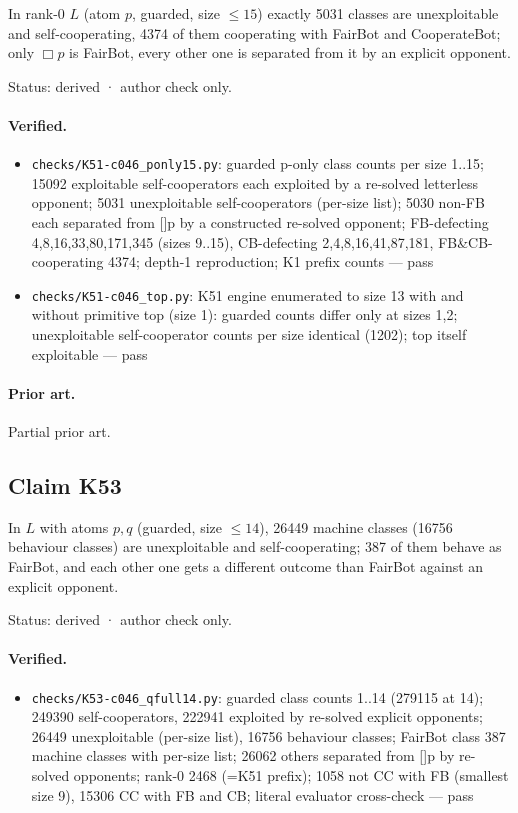 \documentclass{article}
\begin{document}
In rank-0 $L$ (atom $p$, guarded, size $\le15$) exactly 5031 classes are unexploitable and self-cooperating, 4374 of them cooperating with FairBot and CooperateBot; only $\Box p$ is FairBot, every other one is separated from it by an explicit opponent.

Status: derived · author check only.

\paragraph{Verified.}
\begin{itemize}
\item \texttt{checks/K51-c046\_ponly15.py}: guarded p-only class counts per size 1..15; 15092 exploitable self-cooperators each exploited by a re-solved letterless opponent; 5031 unexploitable self-cooperators (per-size list); 5030 non-FB each separated from []p by a constructed re-solved opponent; FB-defecting 4,8,16,33,80,171,345 (sizes 9..15), CB-defecting 2,4,8,16,41,87,181, FB\&CB-cooperating 4374; depth-1 reproduction; K1 prefix counts --- pass
\item \texttt{checks/K51-c046\_top.py}: K51 engine enumerated to size 13 with and without primitive top (size 1): guarded counts differ only at sizes 1,2; unexploitable self-cooperator counts per size identical (1202); top itself exploitable --- pass
\end{itemize}

\paragraph{Prior art.} Partial prior art.

\subsection*{Claim K53}

In $L$ with atoms $p,q$ (guarded, size $\le14$), 26449 machine classes (16756 behaviour classes) are unexploitable and self-cooperating; 387 of them behave as FairBot, and each other one gets a different outcome than FairBot against an explicit opponent.

Status: derived · author check only.

\paragraph{Verified.}
\begin{itemize}
\item \texttt{checks/K53-c046\_qfull14.py}: guarded class counts 1..14 (279115 at 14); 249390 self-cooperators, 222941 exploited by re-solved explicit opponents; 26449 unexploitable (per-size list), 16756 behaviour classes; FairBot class 387 machine classes with per-size list; 26062 others separated from []p by re-solved opponents; rank-0 2468 (=K51 prefix); 1058 not CC with FB (smallest size 9), 15306 CC with FB and CB; literal evaluator cross-check --- pass
\end{itemize}
\end{document}
